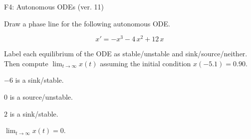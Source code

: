 \begin{exercise}
  \begin{exerciseTitle}F4: Autonomous ODEs (ver. 11)\end{exerciseTitle}
  \begin{exerciseStatement}
    

      Draw a phase line for the following 
      autonomous ODE.
    

    
\[x'= -x^{3} - 4 \, x^{2} + 12 \, x\]

    

      Label each equilibrium of the ODE
      as stable/unstable and sink/source/neither.
      Then compute \(\lim_{t\to\infty}x(t)\)
      assuming the initial condition
      \(x( -5.1 )= 0.90\).
    

  \end{exerciseStatement}
  \begin{exerciseAnswer}
    

      \(-6\) is a sink/stable.
      
        \(0\) is a source/unstable.
      
      \(2\) is a sink/stable.
    

    

      \(\lim_{t\to\infty}x(t)=0\).
    

  \end{exerciseAnswer}
\end{exercise}